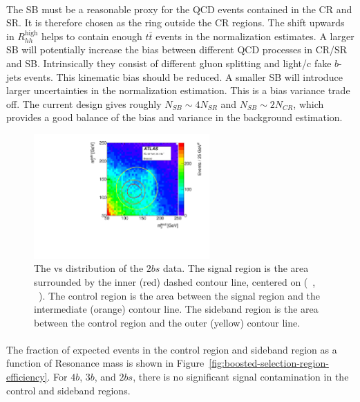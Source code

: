 \paragraph{}
The SB must be a reasonable proxy for the QCD events contained in the CR and SR.
It is therefore chosen as the ring outside the CR regions.
The shift upwards in $R_{hh}^{\text{high}}$ helps to contain enough $t\bar{t}$ events in the normalization estimates.
A larger SB will potentially increase the bias between different QCD processes in CR/SR and SB.
Intrinsically they consist of different gluon splitting and light/c fake $b$-jets events.
This kinematic bias should be reduced.
A smaller SB will introduce larger uncertainties in the normalization estimation.
This is a bias variance trade off.
The current design gives roughly $N_{SB} \sim 4 N_{SR}$ and $N_{SB} \sim 2 N_{CR}$, which provides a good balance of the bias and variance in the background estimation.

\begin{figure}[htbp!]
\begin{center}
  \includegraphics[width=0.6\textwidth,angle=-90]{figures/boosted/Other/TwoTag_split_Incl_data_mH0H1.pdf}
  \caption{The \mleadJ vs \msublJ distribution of the $2bs$ data. The signal region is the area surrounded by the inner (red) dashed contour line, centered on (~\GeV, ~\GeV). The control region is the area between the signal region and the intermediate (orange) contour line. The sideband region is the area between the control region and the outer (yellow) contour line.}
  \label{fig:boosted-region-def}
\end{center}
\end{figure}

\paragraph{}
The fraction of expected events in the control region and sideband region as a function of \Grav Resonance mass is shown in Figure~\ref{fig:boosted-selection-region-efficiency}. 
For $4b$, $3b$, and $2bs$, there is no significant signal contamination in the control and sideband regions.

